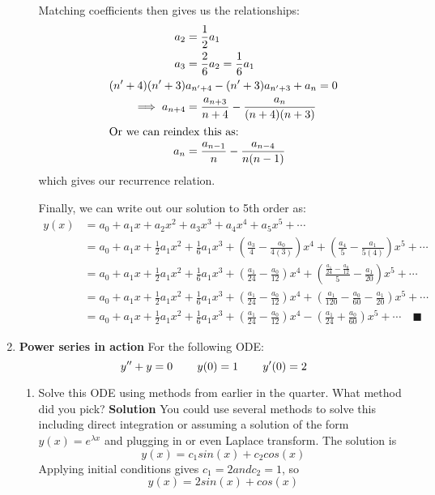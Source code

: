 \documentclass[letterpaper, fontsize=11pt]{scrartcl} %
\numberwithin{equation}{section} %
\numberwithin{figure}{section} %
\numberwithin{table}{section} %
\begin{document}
\begin{enumerate}
\begin{enumerate}
Matching coefficients then gives us the relationships:
\begin{align*}
a_2 &= \frac{1}{2}a_1\\
a_3 &= \frac{2}{6} a_2 = \frac{1}{6}a_1\\
(n'+4)(n'+3)&a_{n'+4} - (n'+3) a_{n'+3}  +  a_n = 0\\
\implies a_{n + 4} &= \frac{a_{n+3}}{n+4} - \frac{a_n}{(n+4)(n+3)}\\
\intertext{Or we can reindex this as:}
a_{n} &= \frac{a_{n-1}}{n} - \frac{a_{n-4}}{n(n-1)}
\end{align*}
which gives our recurrence relation.

\par Finally, we can write out our solution to 5th order as:
\begin{align*}
y(x) &= a_0 + a_1x + a_2x^2 + a_3x^3 + a_4 x^4 + a_5 x^5 + \cdots\\
 &= a_0 + a_1x + \frac{1}{2}a_1x^2 + \frac{1}{6}a_1x^3 +\left( \frac{a_{3}}{4} - \frac{a_{0}}{4(3)} \right)x^4 +
 \left( \frac{a_{4}}{5} - \frac{a_{1}}{5(4)} \right)x^5 + \cdots\\
  &= a_0 + a_1x + \frac{1}{2}a_1x^2 + \frac{1}{6}a_1x^3 +\left( \frac{a_1}{24} - \frac{a_{0}}{12} \right)x^4 +
 \left( \frac{\frac{a_1}{24} - \frac{a_{0}}{12} }{5} - \frac{a_1}{20} \right)x^5 + \cdots \\
   &= a_0 + a_1x + \frac{1}{2}a_1x^2 + \frac{1}{6}a_1x^3 +\left( \frac{a_1}{24} - \frac{a_{0}}{12} \right)x^4 +
 \left( \frac{a_1}{120} - \frac{a_{0}}{60} - \frac{a_1}{20} \right)x^5 + \cdots \\
    &= a_0 + a_1x + \frac{1}{2}a_1x^2 + \frac{1}{6}a_1x^3 +\left( \frac{a_1}{24} - \frac{a_{0}}{12} \right)x^4 -
 \left( \frac{a_1}{24} + \frac{a_{0}}{60} \right)x^5 + \cdots \quad\blacksquare
\end{align*}

\end{enumerate}

\item \textbf{Power series in action}  For the following ODE:
$$y'' + y = 0 \hspace{0.3in} y(0) = 1  \hspace{0.3in} y'(0) = 2$$
\begin{enumerate}

\item Solve this ODE using methods from earlier in the quarter. What method did you pick? \newline
\textbf{Solution} \newline
You could use several methods to solve this including direct integration or assuming a solution of the form $y(x) = e^{\lambda x}$ and plugging in or even Laplace transform. The solution is $$ y(x) = c_1 sin(x) + c_2 cos(x)$$
Applying initial conditions gives $c_1 = 2 and c_2 = 1$, so $$y(x) = 2sin(x) + cos(x)$$


\end{enumerate}
\end{enumerate}
\end{document}
